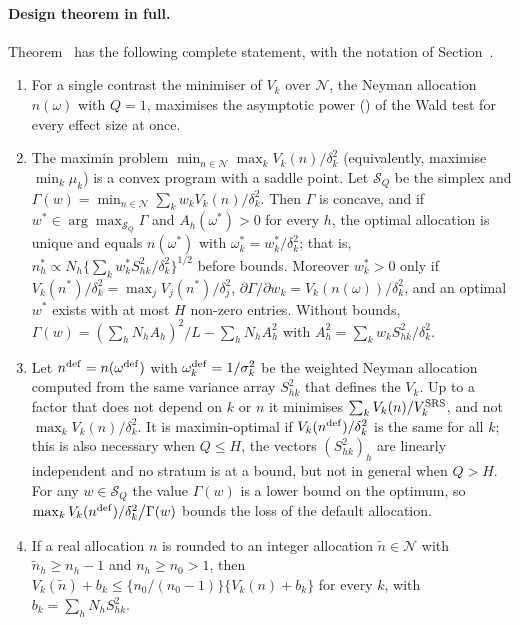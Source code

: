 \paragraph{Design theorem in full.} Theorem~ has the following complete statement, with the notation of Section~.
\begin{theorem}\label{thm:design-full}
\begin{enumerate}
\item[(a)] For a single contrast the minimiser of $V_k$ over $\mathcal N$, the Neyman allocation $n(\omega)$ with $Q=1$, maximises the asymptotic power () of the Wald test for every effect size at once.
\item[(b)] The maximin problem $\min_{n\in\mathcal N}\max_kV_k(n)/\delta_k^2$ (equivalently, maximise $\min_k\mu_k$) is a convex program with a saddle point. Let $\mathcal S_Q$ be the simplex and $\Gamma(w)=\min_{n\in\mathcal N}\sum_kw_kV_k(n)/\delta_k^2$. Then $\Gamma$ is concave, and if $w^\ast\in\arg\max_{\mathcal S_Q}\Gamma$ and $A_h(\omega^\ast)>0$ for every $h$, the optimal allocation is unique and equals $n(\omega^\ast)$ with $\omega^\ast_k=w^\ast_k/\delta_k^2$; that is, $n^\ast_h\propto N_h\{\sum_kw^\ast_kS^2_{hk}/\delta_k^2\}^{1/2}$ before bounds. Moreover $w^\ast_k>0$ only if $V_k(n^\ast)/\delta_k^2=\max_jV_j(n^\ast)/\delta_j^2$, $\partial\Gamma/\partial w_k=V_k(n(\omega))/\delta_k^2$, and an optimal $w^\ast$ exists with at most $H$ non-zero entries. Without bounds, $\Gamma(w)=(\sum_hN_hA_h)^2/L-\sum_hN_hA_h^2$ with $A_h^2=\sum_kw_kS^2_{hk}/\delta_k^2$.
\item[(c)] Let $n^{\rm def}=n(\omega^{\rm def})$ with $\omega^{\rm def}_k=1/\sigma_k^2$ be the weighted Neyman allocation computed from the same variance array $S^2_{hk}$ that defines the $V_k$. Up to a factor that does not depend on $k$ or $n$ it minimises $\sum_kV_k(n)/V^{\rm SRS}_k$, and not $\max_kV_k(n)/\delta_k^2$. It is maximin-optimal if $V_k(n^{\rm def})/\delta_k^2$ is the same for all $k$; this is also necessary when $Q\le H$, the vectors $(S^2_{hk})_h$ are linearly independent and no stratum is at a bound, but not in general when $Q>H$. For any $w\in\mathcal S_Q$ the value $\Gamma(w)$ is a lower bound on the optimum, so $\max_kV_k(n^{\rm def})/\delta_k^2\big/\Gamma(w)$ bounds the loss of the default allocation.
\item[(d)] If a real allocation $n$ is rounded to an integer allocation $\tilde n\in\mathcal N$ with $\tilde n_h\ge n_h-1$ and $n_h\ge n_0>1$, then $V_k(\tilde n)+b_k\le\{n_0/(n_0-1)\}\{V_k(n)+b_k\}$ for every $k$, with $b_k=\sum_hN_hS^2_{hk}$.
\end{enumerate}
\end{theorem}
